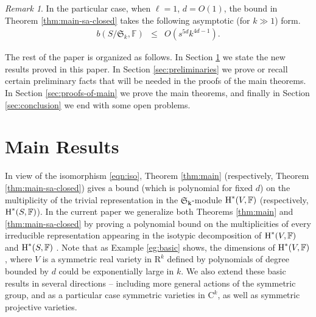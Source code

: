 \documentclass{amsart}
\theoremstyle{definition}
\theoremstyle{remark}
\newtheorem{remark}{Remark}
\numberwithin{equation}{section}
\begin{document}
\begin{remark}
\label{rem:main-sa-closed}
  In the particular case, when $\ell =1$, $d=O (1)$, the bound in Theorem
  \ref{thm:main-sa-closed} takes the following asymptotic (for $k \gg 1$)
  form.
  \begin{eqnarray*}
    b (S/\mathfrak{S}_{k} ,{\mathbb{F}}) & \leq & O  (s^{5d} k^{4d-1}) .
  \end{eqnarray*}
\end{remark}

The rest of the paper is organized as follows. In Section \ref{sec:results} we state the new results proved in this paper.
In Section \ref{sec:preliminaries} we prove or recall certain preliminary facts that will be needed in the proofs of the
main theorems.  In Section \ref{sec:proofs-of-main} we prove the main theorems, and finally in Section
\ref{sec:conclusion} we end with some open problems.

\section{Main Results}
\label{sec:results}
In view of the isomorphism \eqref{eqn:iso},  Theorem \ref{thm:main} (respectively, 
Theorem \ref{thm:main-sa-closed}) gives  a 
bound (which is polynomial for fixed $d$)  on the multiplicity of the trivial representation in the $\mathfrak{S}_{\mathbf{k}}$-module ${\mbox{\rm H}}^\ast(V,{\mathbb{F}})$ (respectively, ${\mbox{\rm H}}^\ast(S,{\mathbb{F}})$).
In the current paper we generalize  both Theorems \ref{thm:main} and \ref{thm:main-sa-closed}  by proving a polynomial bound on the multiplicities of every irreducible
representation  appearing in the isotypic decomposition of ${\mbox{\rm H}}^\ast(V,{\mathbb{F}})$ and ${\mbox{\rm H}}^\ast(S,{\mathbb{F}})$ .
Note that as Example \ref{eg:basic} shows,
the dimensions of ${\mbox{\rm H}}^\ast(V,{\mathbb{F}})$, where $V$ is a 
symmetric real variety in ${\mathrm{R}}^k$ 
defined by polynomials of degree bounded by $d$ could be
exponentially large in $k$.
We also extend these basic results in several directions -- including more general actions of the symmetric group, and as a particular case symmetric varieties in ${\mathrm{C}}^k$,  as well as symmetric projective varieties.
\end{document}

